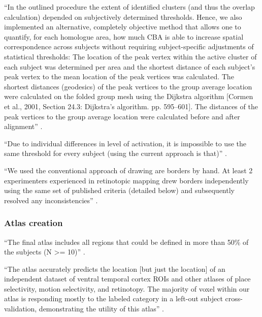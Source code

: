 ``In the outlined procedure the extent of identified clusters (and thus the
overlap calculation) depended on subjectively determined thresholds.
%
Hence, we also implemented an alternative, completely objective method that
allows one to quantify, for each homologue area, how much CBA is able to
increase spatial correspondence across subjects without requiring
subject-specific adjustments of statistical thresholds:
%
The location of the peak vertex within the active cluster of each subject was
determined per area and the shortest distance of each subject's peak vertex to
the mean location of the peak vertices was calculated.
%
The shortest distances (geodesics) of the peak vertices to the group average
location were calculated on the folded group mesh using the Dijkstra algorithm
[Cormen et al., 2001, Section 24.3: Dijkstra's algorithm. pp. 595–601].
%
The distances of the peak vertices to the group average location were calculated
before and after alignment'' \citep{frost2012measuring}.

``Due to individual differences in level of activation, it is impossible to use
the same threshold for every subject (using the current approach is that)''
\citep{frost2012measuring}.



``We used the conventional approach of drawing are borders by hand.
%
At least 2 experimenters experienced in retinotopic mapping drew borders
independently using the same set of published criteria (detailed below) and
subsequently resolved any inconsistencies'' \citep{wang2015probabilistic}.


\subsubsection{Atlas creation}







``The final atlas includes all regions that could be defined in more than 50\%
of the subjects (N >= 10)'' \citep{rosenke2021probabilistic}.

``The atlas accurately predicts the location [but just the location] of an
independent dataset of ventral temporal cortex ROIs and other atlases of place
selectivity, motion selectivity, and retinotopy.
%
The majority of voxel within our atlas is responding mostly to the labeled
category in a left-out subject cross-validation, demonstrating the utility of
this atlas'' \citep{rosenke2021probabilistic}.

